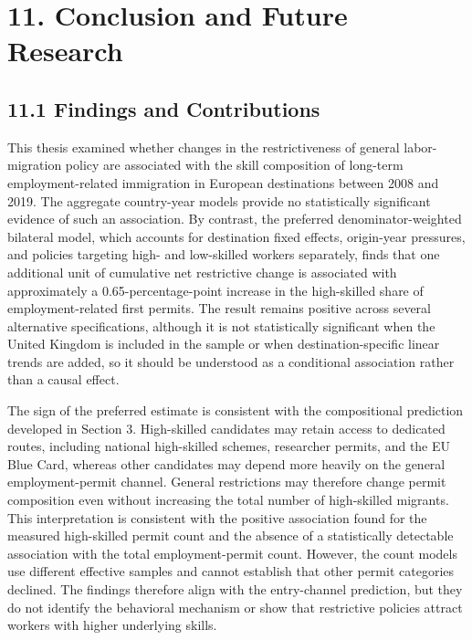 \documentclass[11pt,a4paper]{article}
\begin{document}
\clearpage
\section{11. Conclusion and Future
Research}\label{conclusion-and-future-research}

\subsection{11.1 Findings and
Contributions}\label{findings-and-contributions}

This thesis examined whether changes in the restrictiveness of general
labor-migration policy are associated with the skill composition of
long-term employment-related immigration in European destinations
between 2008 and 2019. The aggregate country-year models provide no
statistically significant evidence of such an association. By contrast,
the preferred denominator-weighted bilateral model, which accounts for
destination fixed effects, origin-year pressures, and policies targeting
high- and low-skilled workers separately, finds that one additional unit
of cumulative net restrictive change is associated with approximately a
0.65-percentage-point increase in the high-skilled share of
employment-related first permits. The result remains positive across
several alternative specifications, although it is not statistically
significant when the United Kingdom is included in the sample or when
destination-specific linear trends are added, so it should be understood
as a conditional association rather than a causal effect.

The sign of the preferred estimate is consistent with the compositional
prediction developed in Section 3. High-skilled candidates may retain
access to dedicated routes, including national high-skilled schemes,
researcher permits, and the EU Blue Card, whereas other candidates may
depend more heavily on the general employment-permit channel. General
restrictions may therefore change permit composition even without
increasing the total number of high-skilled migrants. This
interpretation is consistent with the positive association found for the
measured high-skilled permit count and the absence of a statistically
detectable association with the total employment-permit count. However,
the count models use different effective samples and cannot establish
that other permit categories declined. The findings therefore align with
the entry-channel prediction, but they do not identify the behavioral
mechanism or show that restrictive policies attract workers with higher
underlying skills.
\end{document}
